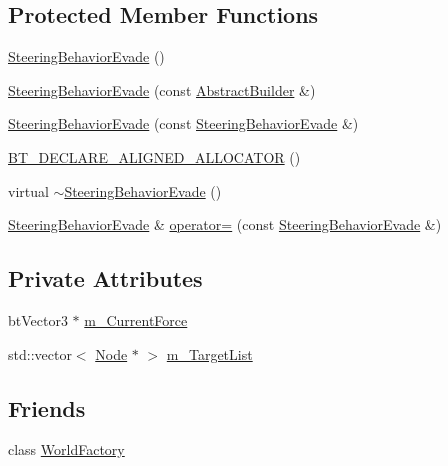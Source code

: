 \subsection*{Protected Member Functions}
\begin{DoxyCompactItemize}
\item 
\mbox{\hyperlink{classnjli_1_1_steering_behavior_evade_a3b2bf55e7de5cffd95d35c5ae03b1e2c}{Steering\+Behavior\+Evade}} ()
\item 
\mbox{\hyperlink{classnjli_1_1_steering_behavior_evade_ab690e849c1699c0ea8f0f45a641149fa}{Steering\+Behavior\+Evade}} (const \mbox{\hyperlink{classnjli_1_1_abstract_builder}{Abstract\+Builder}} \&)
\item 
\mbox{\hyperlink{classnjli_1_1_steering_behavior_evade_ab2f526815d1db75b34913d218834ff17}{Steering\+Behavior\+Evade}} (const \mbox{\hyperlink{classnjli_1_1_steering_behavior_evade}{Steering\+Behavior\+Evade}} \&)
\item 
\mbox{\hyperlink{classnjli_1_1_steering_behavior_evade_a7cced66738b3fb41e6b4b1c1a7e06984}{B\+T\+\_\+\+D\+E\+C\+L\+A\+R\+E\+\_\+\+A\+L\+I\+G\+N\+E\+D\+\_\+\+A\+L\+L\+O\+C\+A\+T\+OR}} ()
\item 
virtual \mbox{\hyperlink{classnjli_1_1_steering_behavior_evade_ad657a3f3bee6e39ec90723cbbc524bf1}{$\sim$\+Steering\+Behavior\+Evade}} ()
\item 
\mbox{\hyperlink{classnjli_1_1_steering_behavior_evade}{Steering\+Behavior\+Evade}} \& \mbox{\hyperlink{classnjli_1_1_steering_behavior_evade_ab21b49cd6e2615dd5052a766b3b2cbbf}{operator=}} (const \mbox{\hyperlink{classnjli_1_1_steering_behavior_evade}{Steering\+Behavior\+Evade}} \&)
\end{DoxyCompactItemize}
\subsection*{Private Attributes}
\begin{DoxyCompactItemize}
\item 
bt\+Vector3 $\ast$ \mbox{\hyperlink{classnjli_1_1_steering_behavior_evade_abc8badd2f0463a5cf90faa1f24e02fcf}{m\+\_\+\+Current\+Force}}
\item 
std\+::vector$<$ \mbox{\hyperlink{classnjli_1_1_node}{Node}} $\ast$ $>$ \mbox{\hyperlink{classnjli_1_1_steering_behavior_evade_acada4d21166aa029aec597546182c44b}{m\+\_\+\+Target\+List}}
\end{DoxyCompactItemize}
\subsection*{Friends}
\begin{DoxyCompactItemize}
\item 
class \mbox{\hyperlink{classnjli_1_1_steering_behavior_evade_acb96ebb09abe8f2a37a915a842babfac}{World\+Factory}}
\end{DoxyCompactItemize}
